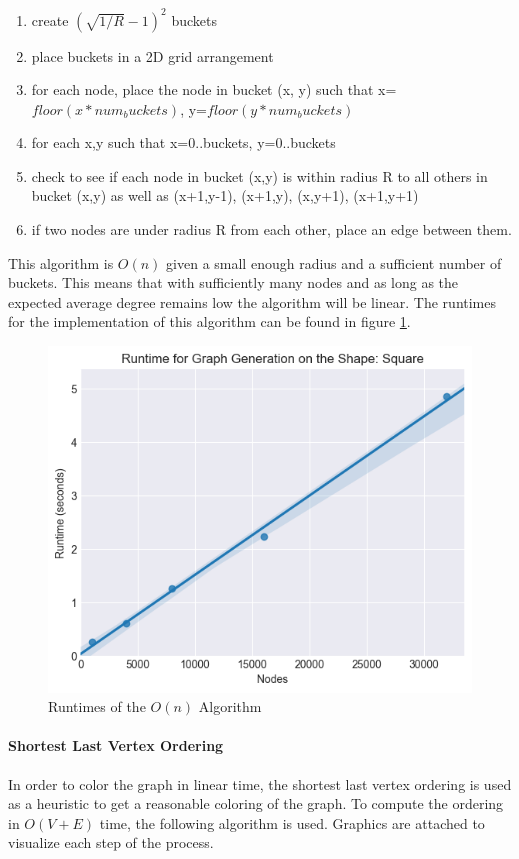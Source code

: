 \documentclass{article}
\begin{document}
    \begin{enumerate}
      \item create $(\sqrt{1/R} - 1 )^2$ buckets
      \item place buckets in a 2D grid arrangement
      \item for each node, place the node in bucket (x, y) such that x=$floor(x*num_buckets)$, y=$floor(y*num_buckets)$
      \item for each x,y such that x=0..buckets, y=0..buckets
      \item check to see if each node in bucket (x,y) is within radius R to all others in bucket (x,y) as well as (x+1,y-1), (x+1,y), (x,y+1), (x+1,y+1)
      \item if two nodes are under radius R from each other, place an edge between them.
    \end{enumerate}
    This algorithm is $O(n)$ given a small enough radius and a sufficient number of buckets.
    This means that with sufficiently many nodes and as long as the expected average degree remains low the algorithm will be linear.
    The runtimes for the implementation of this algorithm can be found in figure \ref{optimised_runtimes_for_connection}.
    \begin{figure}
      \centering
      \label{optimised_runtimes_for_connection}
  		\includegraphics[width=1 \textwidth]{square/generation/runtime/runtime_chart}
  		\caption{Runtimes of the $O(n)$ Algorithm}
	  \end{figure}

  \paragraph{Shortest Last Vertex Ordering}
    In order to color the graph in linear time, the shortest last vertex ordering is used as a heuristic to get a reasonable coloring of the graph.
    To compute the ordering in $O(V+E)$ time, the following algorithm is used.
    Graphics are attached to visualize each step of the process.
\end{document}
